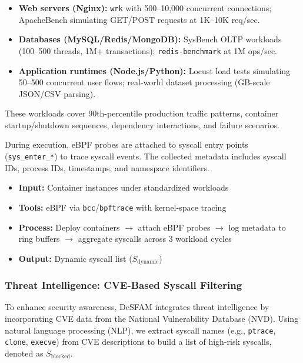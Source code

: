 \begin{itemize}
  \item \textbf{Web servers (Nginx):} \texttt{wrk} with 500--10,000 concurrent connections;
        ApacheBench simulating GET/POST requests at 1K--10K req/sec.
  \item \textbf{Databases (MySQL/Redis/MongoDB):} SysBench OLTP workloads (100--500 threads,
        1M+ transactions); \texttt{redis-benchmark} at 1M ops/sec.
  \item \textbf{Application runtimes (Node.js/Python):} Locust load tests simulating 50--500
        concurrent user flows; real-world dataset processing (GB-scale JSON/CSV parsing).
\end{itemize}

These workloads cover 90th-percentile production traffic patterns, container startup/shutdown
sequences, dependency interactions, and failure scenarios.

During execution, eBPF probes are attached to syscall entry points (\texttt{sys\_enter\_*}) to
trace syscall events. The collected metadata includes syscall IDs, process IDs, timestamps, and
namespace identifiers.

\begin{itemize}
  \item \textbf{Input:} Container instances under standardized workloads
  \item \textbf{Tools:} eBPF via \texttt{bcc}/\texttt{bpftrace} with kernel-space tracing
  \item \textbf{Process:} Deploy containers $\to$ attach eBPF probes $\to$ log metadata to ring
        buffers $\to$ aggregate syscalls across 3 workload cycles
  \item \textbf{Output:} Dynamic syscall list ($S_{\text{dynamic}}$)
\end{itemize}

\subsubsection{Threat Intelligence: CVE-Based Syscall Filtering}
\label{subsubsec:cve_filtering}

To enhance security awareness, DeSFAM integrates threat intelligence by incorporating CVE data
from the National Vulnerability Database (NVD). Using natural language processing (NLP), we
extract syscall names (e.g., \texttt{ptrace}, \texttt{clone}, \texttt{execve}) from CVE
descriptions to build a list of high-risk syscalls, denoted as $S_{\text{blocked}}$.

